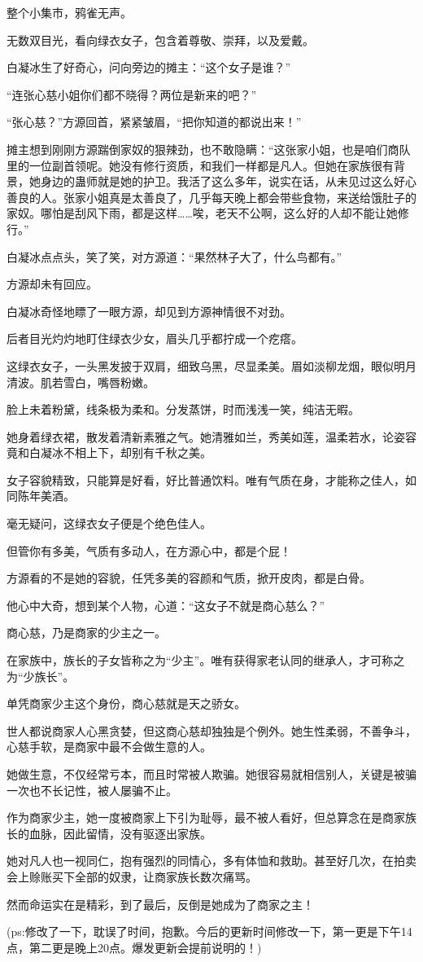 \begin{this_body}
整个小集市，鸦雀无声。

无数双目光，看向绿衣女子，包含着尊敬、崇拜，以及爱戴。

白凝冰生了好奇心，问向旁边的摊主：“这个女子是谁？”

“连张心慈小姐你们都不晓得？两位是新来的吧？”

“张心慈？”方源回首，紧紧皱眉，“把你知道的都说出来！”

摊主想到刚刚方源踹倒家奴的狠辣劲，也不敢隐瞒：“这张家小姐，也是咱们商队里的一位副首领呢。她没有修行资质，和我们一样都是凡人。但她在家族很有背景，她身边的蛊师就是她的护卫。我活了这么多年，说实在话，从未见过这么好心善良的人。张家小姐真是太善良了，几乎每天晚上都会带些食物，来送给饿肚子的家奴。哪怕是刮风下雨，都是这样……唉，老天不公啊，这么好的人却不能让她修行。”

白凝冰点点头，笑了笑，对方源道：“果然林子大了，什么鸟都有。”

方源却未有回应。

白凝冰奇怪地瞟了一眼方源，却见到方源神情很不对劲。

后者目光灼灼地盯住绿衣少女，眉头几乎都拧成一个疙瘩。

这绿衣女子，一头黑发披于双肩，细致乌黑，尽显柔美。眉如淡柳龙烟，眼似明月清波。肌若雪白，嘴唇粉嫩。

脸上未着粉黛，线条极为柔和。分发蒸饼，时而浅浅一笑，纯洁无暇。

她身着绿衣裙，散发着清新素雅之气。她清雅如兰，秀美如莲，温柔若水，论姿容竟和白凝冰不相上下，却别有千秋之美。

女子容貌精致，只能算是好看，好比普通饮料。唯有气质在身，才能称之佳人，如同陈年美酒。

毫无疑问，这绿衣女子便是个绝色佳人。

但管你有多美，气质有多动人，在方源心中，都是个屁！

方源看的不是她的容貌，任凭多美的容颜和气质，掀开皮肉，都是白骨。

他心中大奇，想到某个人物，心道：“这女子不就是商心慈么？”

商心慈，乃是商家的少主之一。

在家族中，族长的子女皆称之为“少主”。唯有获得家老认同的继承人，才可称之为“少族长”。

单凭商家少主这个身份，商心慈就是天之骄女。

世人都说商家人心黑贪婪，但这商心慈却独独是个例外。她生性柔弱，不善争斗，心慈手软，是商家中最不会做生意的人。

她做生意，不仅经常亏本，而且时常被人欺骗。她很容易就相信别人，关键是被骗一次也不长记性，被人屡骗不止。

作为商家少主，她一度被商家上下引为耻辱，最不被人看好，但总算念在是商家族长的血脉，因此留情，没有驱逐出家族。

她对凡人也一视同仁，抱有强烈的同情心，多有体恤和救助。甚至好几次，在拍卖会上赊账买下全部的奴隶，让商家族长数次痛骂。

然而命运实在是精彩，到了最后，反倒是她成为了商家之主！

(ps:修改了一下，耽误了时间，抱歉。今后的更新时间修改一下，第一更是下午14点，第二更是晚上20点。爆发更新会提前说明的！)

\end{this_body}

